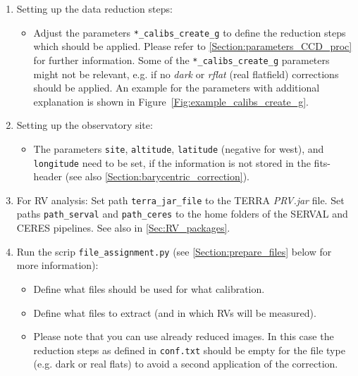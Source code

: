\documentclass[10pt,a4paper]{article}
\begin{document}
\begin{enumerate}
  \item Setting up the data reduction steps: \vspace*{-\itemsep}
  \begin{itemize}[leftmargin=*]\setlength\itemsep{0em}
    \item Adjust the parameters \verb|*_calibs_create_g| to define the reduction steps which should be applied. Please refer to \ref{Section:parameters_CCD_proc} for further information. Some of the \verb|*_calibs_create_g| parameters might not be relevant, e.g. if no \textit{dark} or \textit{rflat} (real flatfield) corrections should be applied. An example for the parameters with additional explanation is shown in Figure~\ref{Fig:example_calibs_create_g}.
  \end{itemize}

  \item Setting up the observatory site: \vspace*{-\itemsep}
  \begin{itemize}[leftmargin=*]\setlength\itemsep{0em}
    \item The parameters \verb|site|, \verb|altitude|, \verb|latitude| (negative for west), and \verb|longitude| need to be set, if the information is not stored in the fits-header (see also \ref{Section:barycentric_correction}).
  \end{itemize}
  
  \item For RV analysis: Set path \verb|terra_jar_file| to the TERRA \textit{PRV.jar} file. Set paths \verb|path_serval| and \verb|path_ceres| to the home folders of the SERVAL and CERES pipelines. See also in \ref{Sec:RV_packages}.
  
  \item Run the scrip \verb|file_assignment.py| (see \ref{Section:prepare_files} below for more information): \vspace*{-\itemsep}
  \begin{itemize}[leftmargin=*]\setlength\itemsep{0em}
    \item Define what files should be used for what calibration.
    \item Define what files to extract (and in which RVs will be measured).
    \item Please note that you can use already reduced images. In this case the reduction steps as defined in \verb|conf.txt| should be empty for the file type (e.g. dark or real flats) to avoid a second application of the correction.
  \end{itemize}
  

\end{enumerate}
\end{document}
